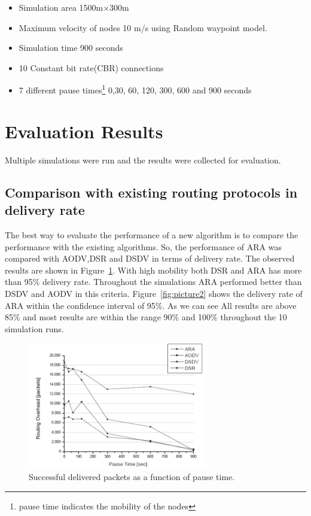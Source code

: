 \begin{itemize}
\item Simulation area  1500m×300m 
\item Maximum velocity of nodes 10 m/s using Random waypoint model.
\item Simulation time  900 seconds
\item 10 Constant bit rate(CBR) connections
\item 7 different pause times\footnote{pause time indicates the mobility of the nodes} 0,30, 60, 120, 300, 600 and 900 seconds
\end{itemize}


\section{Evaluation Results}
Multiple simulations were run and the results were collected for evaluation. 
\subsection{Comparison with existing routing protocols in delivery rate}
The best way to evaluate the performance of a new algorithm is to compare the performance with the existing algorithms. So, the performance of ARA was compared with AODV,DSR and DSDV in terms of delivery rate. The observed results are shown in Figure~\ref{fig:picture1}. With high mobility both DSR and ARA has more than 95\% delivery rate. 
Throughout the simulations ARA performed better than DSDV and AODV in this criteria. Figure~\ref{fig:picture2} shows the delivery rate of ARA within the confidence interval of 95\%. As we can see All results are above 85\% and most results are within the range 90\% and 100\% throughout the 10 simulation runs.


\begin{figure}[t!]
\centering
\includegraphics[width=0.7\textwidth]{Picture1.png}
\caption{\label{fig:picture1}Successful delivered packets as a
function of pause time.}
\end{figure}



